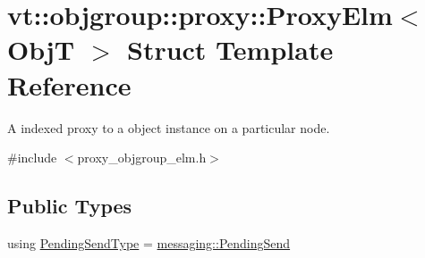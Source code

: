 \hypertarget{structvt_1_1objgroup_1_1proxy_1_1_proxy_elm}{}\section{vt\+:\+:objgroup\+:\+:proxy\+:\+:Proxy\+Elm$<$ ObjT $>$ Struct Template Reference}
\label{structvt_1_1objgroup_1_1proxy_1_1_proxy_elm}


A indexed proxy to a object instance on a particular node.  




{\ttfamily \#include $<$proxy\+\_\+objgroup\+\_\+elm.\+h$>$}

\subsection*{Public Types}
\begin{DoxyCompactItemize}
\item 
using \hyperlink{structvt_1_1objgroup_1_1proxy_1_1_proxy_elm_ab0f40d6a0191c974a4f4dd9dec0fc02f}{Pending\+Send\+Type} = \hyperlink{structvt_1_1messaging_1_1_pending_send}{messaging\+::\+Pending\+Send}
\end{DoxyCompactItemize}
